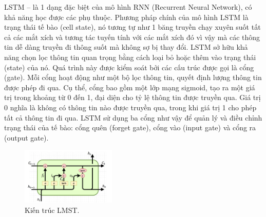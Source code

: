 LSTM – là 1 dạng đặc biệt của mô hình RNN (Recurrent Neural Network), có khả năng học được các phụ thuộc. Phương pháp chính của mô hình LSTM là trạng thái tế bào (cell state), nó tương tự như 1 băng truyền chạy xuyên suốt tất cả các mắt xích và tương tác tuyến tính với các mắt xích đó vì vậy mà các thông tin dễ dàng truyền đi thông suốt mà không sợ bị thay đổi. LSTM sở hữu khả năng chọn lọc thông tin quan trọng bằng cách loại bỏ hoặc thêm vào trạng thái (state) của nó. Quá trình này được kiểm soát bởi các cấu trúc được gọi là cổng (gate). Mỗi cổng hoạt động như một bộ lọc thông tin, quyết định lượng thông tin được phép đi qua. Cụ thể, cổng bao gồm một lớp mạng sigmoid, tạo ra một giá trị trong khoảng từ 0 đến 1, đại diện cho tỷ lệ thông tin được truyền qua. Giá trị 0 nghĩa là không có thông tin nào được truyền qua, trong khi giá trị 1 cho phép tất cả thông tin đi qua. LSTM sử dụng ba cổng như vậy để quản lý và điều chỉnh trạng thái của tế bào: cổng quên (forget gate), cổng vào (input gate) và cổng ra (output gate).

\begin{figure}[htbp]
\centerline{\includegraphics[width=0.4\textwidth]{img/LSTM.jpg}}
\caption{Kiến trúc LMST.}
\label{fig}
\end{figure}